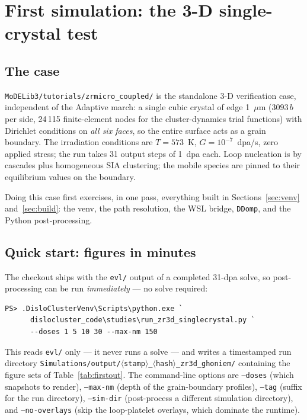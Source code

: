 \documentclass[11pt]{article}
\newcommand{\code}[1]{\texttt{\small #1}}
\newcommand{\file}[1]{\texttt{\footnotesize #1}}
\begin{document}
\section{First simulation: the 3-D single-crystal test}
\label{sec:firstsim}
\label{sec:first}

\subsection{The case}

\file{MoDELib3/tutorials/zrmicro\_coupled/} is the standalone 3-D
verification case, independent of the Adaptive march: a single cubic crystal
of edge 1~$\mu$m ($3093\,b$ per side, 24\,115 finite-element nodes for the
cluster-dynamics trial functions) with Dirichlet conditions on \emph{all six
faces}, so the entire surface acts as a grain boundary. The irradiation
conditions are $T = 573$~K, $G = 10^{-7}$~dpa/s, zero applied stress; the
run takes 31 output steps of 1~dpa each. Loop nucleation is by cascades plus
homogeneous SIA clustering; the mobile species are pinned to their
equilibrium values on the boundary.

Doing this case first exercises, in one pass, everything built in
Sections~\ref{sec:venv} and~\ref{sec:build}: the venv, the path resolution,
the WSL bridge, \code{DDomp}, and the Python post-processing.

\subsection{Quick start: figures in minutes}
\label{sec:quickfigs}

The checkout ships with the \file{evl/} output of a completed 31-dpa solve,
so post-processing can be run \emph{immediately} --- no solve required:

\begin{lstlisting}[style=ps]
PS> .DisloClusterVenv\Scripts\python.exe `
      dislocluster_code\studies\run_zr3d_singlecrystal.py `
      --doses 1 5 10 30 --max-nm 150
\end{lstlisting}

This reads \file{evl/} only --- it never runs a solve --- and writes a
timestamped run directory
\file{Simulations/output/$\langle$stamp$\rangle$\_$\langle$hash$\rangle$\_zr3d\_ghoniem/}
containing the figure sets of Table~\ref{tab:firstout}. The command-line
options are \code{--doses} (which snapshots to render), \code{--max-nm}
(depth of the grain-boundary profiles), \code{--tag} (suffix for the run
directory), \code{--sim-dir} (post-process a different simulation directory),
and \code{--no-overlays} (skip the loop-platelet overlays, which dominate the
runtime).
\end{document}
